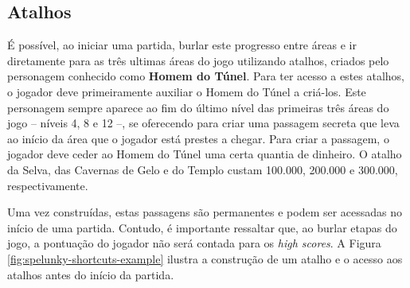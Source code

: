 \subsection{Atalhos}
É possível, ao iniciar uma partida, burlar este progresso entre áreas e ir
diretamente para as três ultimas áreas do jogo utilizando atalhos, criados pelo
personagem conhecido como \textbf{Homem do Túnel}. Para ter acesso a estes
atalhos, o jogador deve primeiramente auxiliar o Homem do Túnel a criá-los. Este
personagem sempre aparece ao fim do último nível das primeiras três áreas do
jogo -- níveis 4, 8 e 12 --, se oferecendo para criar uma passagem secreta que
leva ao início da área que o jogador está prestes a chegar. Para criar a
passagem, o jogador deve ceder ao Homem do Túnel uma certa quantia de dinheiro.
O atalho da Selva, das Cavernas de Gelo e do Templo custam 100.000, 200.000 e
300.000, respectivamente.

Uma vez construídas, estas passagens são permanentes e podem ser acessadas no
início de uma partida. Contudo, é importante ressaltar que, ao burlar etapas do
jogo, a pontuação do jogador não será contada para os \textit{high scores}. A
Figura \ref{fig:spelunky-shortcuts-example} ilustra a construção de um atalho e
o acesso aos atalhos antes do início da partida.

